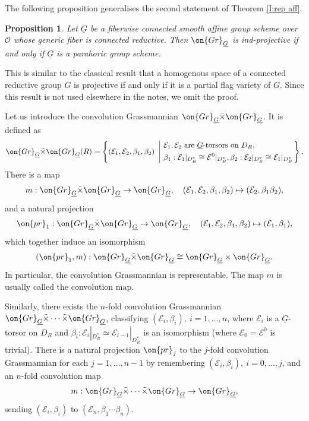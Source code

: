 \documentclass[]{pcmi}
\theoremstyle{plain}
\newtheorem{prop}[equation]{Proposition}
\theoremstyle{remark}
\theoremstyle{definition}
\newcommand{\mE}{{\mathcal E}}
\newcommand{\mO}{{\mathcal O}}
\newcommand{\Gr}{{\on{Gr}}}
\newcommand{\pr}{{\on{pr}}}
\begin{document}
The following proposition generalises the second statement of Theorem \ref{I:rep aff}.
\begin{prop}\label{indproper}
Let $\underline G$ be a fiberwise connected smooth affine group scheme over $\mO$ whose generic fiber is connected reductive. Then $\Gr_{\underline G}$ is ind-projective if and only if $\underline G$ is a parahoric group scheme.
\end{prop}
This is similar to the classical result that a homogenous space of a connected reductive group $G$ is projective if and only if it is a partial flag variety of $G$. Since this result is not used elsewhere in the notes, we omit the proof.





Let us introduce  the convolution Grassmannian $\Gr_{\underline G}\tilde\times\Gr_{\underline G}$. It is defined as
\begin{equation}\label{I:conv}
\Gr_{\underline G}\tilde\times\Gr_{\underline G}(R)=\left\{(\mE_1,\mE_2,\beta_1,\beta_2)\ \left|\ \begin{split}&\mE_1,\mE_2 \mbox{ are } \underline G\mbox{-torsors on } D_R, \\
&  \beta_1:\mE_1|_{D_R^*}\cong \mE^0|_{D_R^*}, \beta_2:\mE_2|_{D_R^*}\cong  \mE_1|_{D_R^*}\end{split}\right.\right\}.
\end{equation}
There is a map
\begin{equation}\label{conv m0}
m:\Gr_{\underline G}\tilde\times\Gr_{\underline G}\to \Gr_{\underline G},\quad (\mE_1,\mE_2,\beta_1,\beta_2)\mapsto (\mE_2, \beta_1\beta_2),
\end{equation}
and a natural projection
$$\pr_1:\Gr_{\underline G}\tilde\times\Gr_{\underline G}\to \Gr_{\underline G}, \quad (\mE_1,\mE_2,\beta_1,\beta_2)\mapsto (\mE_1,\beta_1),$$
which together induce an isomorphism
\begin{equation}\label{I: isom}
(\pr_1,m):\Gr_{\underline G}\tilde\times\Gr_{\underline G}\cong \Gr_{\underline G}\times \Gr_{\underline G}.
\end{equation} 
In particular, the convolution Grassmannian is representable.  The map $m$ is usually called the convolution map.

Similarly, there exists the $n$-fold convolution Grassmannian $\Gr_{\underline G}\tilde\times\cdots\tilde\times\Gr_{\underline G}$, classifying $(\mE_i,\beta_i), \ i=1,\ldots,n$, where $\mE_i$ is a $\underline G$-torsor on $D_R$ and $\beta_i: \mE_{i}|_{D_R^*}\simeq \mE_{i-1}|_{D_R^*}$ is an isomorphism (where $\mE_0=\mE^0$ is trivial). 
There is a natural projection $\pr_j$ to the $j$-fold convolution Grassmannian for each $j=1,\ldots,n-1$ by remembering $(\mE_i,\beta_i),\ i=0,\ldots,j$, and
an $n$-fold convolution map
\begin{equation}\label{conv m}
m:\Gr_{\underline G}\tilde\times\cdots\tilde\times\Gr_{\underline G}\to \Gr_{\underline G},
\end{equation}
sending $(\mE_i,\beta_i)$ to $(\mE_n, \beta_1\cdots\beta_n)$.
\end{document}
